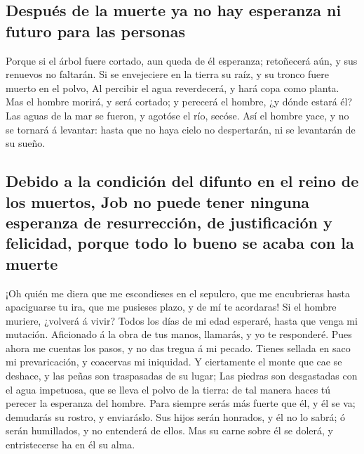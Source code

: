 \hypertarget{despuuxe9s-de-la-muerte-ya-no-hay-esperanza-ni-futuro-para-las-personas}{%
\subsection{Después de la muerte ya no hay esperanza ni futuro para las
personas}\label{despuuxe9s-de-la-muerte-ya-no-hay-esperanza-ni-futuro-para-las-personas}}

 Porque si el árbol fuere cortado, aun queda de él
esperanza; retoñecerá aún, y sus renuevos no faltarán.  Si
se envejeciere en la tierra su raíz, y su tronco fuere muerto en el
polvo,  Al percibir el agua reverdecerá, y hará copa como
planta.  Mas el hombre morirá, y será cortado; y perecerá
el hombre, ¿y dónde estará él?  Las aguas de la mar se
fueron, y agotóse el río, secóse.  Así el hombre yace, y no
se tornará á levantar: hasta que no haya cielo no despertarán, ni se
levantarán de su sueño.

\hypertarget{debido-a-la-condiciuxf3n-del-difunto-en-el-reino-de-los-muertos-job-no-puede-tener-ninguna-esperanza-de-resurrecciuxf3n-de-justificaciuxf3n-y-felicidad-porque-todo-lo-bueno-se-acaba-con-la-muerte}{%
\subsection{Debido a la condición del difunto en el reino de los
muertos, Job no puede tener ninguna esperanza de resurrección, de
justificación y felicidad, porque todo lo bueno se acaba con la
muerte}\label{debido-a-la-condiciuxf3n-del-difunto-en-el-reino-de-los-muertos-job-no-puede-tener-ninguna-esperanza-de-resurrecciuxf3n-de-justificaciuxf3n-y-felicidad-porque-todo-lo-bueno-se-acaba-con-la-muerte}}

 ¡Oh quién me diera que me escondieses en el sepulcro, que
me encubrieras hasta apaciguarse tu ira, que me pusieses plazo, y de mí
te acordaras!  Si el hombre muriere, ¿volverá á vivir?
Todos los días de mi edad esperaré, hasta que venga mi mutación.
 Aficionado á la obra de tus manos, llamarás, y yo te
responderé.  Pues ahora me cuentas los pasos, y no das
tregua á mi pecado.  Tienes sellada en saco mi
prevaricación, y coacervas mi iniquidad.  Y ciertamente el
monte que cae se deshace, y las peñas son traspasadas de su lugar;
 Las piedras son desgastadas con el agua impetuosa, que se
lleva el polvo de la tierra: de tal manera haces tú perecer la esperanza
del hombre.  Para siempre serás más fuerte que él, y él se
va; demudarás su rostro, y enviaráslo.  Sus hijos serán
honrados, y él no lo sabrá; ó serán humillados, y no entenderá de ellos.
 Mas su carne sobre él se dolerá, y entristecerse ha en él
su alma.

